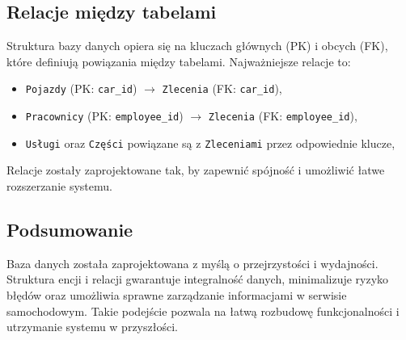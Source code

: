 \subsection{Relacje między tabelami}

Struktura bazy danych opiera się na kluczach głównych (PK) i obcych (FK), które definiują powiązania między tabelami. Najważniejsze relacje to:

\begin{itemize}
  \item \texttt{Pojazdy} (PK: \texttt{car\_id}) $\rightarrow$ \texttt{Zlecenia} (FK: \texttt{car\_id}),
  \item \texttt{Pracownicy} (PK: \texttt{employee\_id}) $\rightarrow$ \texttt{Zlecenia} (FK: \texttt{employee\_id}),
  \item \texttt{Usługi} oraz \texttt{Części} powiązane są z \texttt{Zleceniami} przez odpowiednie klucze,
\end{itemize}

Relacje zostały zaprojektowane tak, by zapewnić spójność i umożliwić łatwe rozszerzanie systemu.

\subsection{Podsumowanie}

Baza danych została zaprojektowana z myślą o przejrzystości i wydajności. Struktura encji i relacji gwarantuje integralność danych, minimalizuje ryzyko błędów oraz umożliwia sprawne zarządzanie informacjami w serwisie samochodowym. Takie podejście pozwala na łatwą rozbudowę funkcjonalności i utrzymanie systemu w przyszłości.